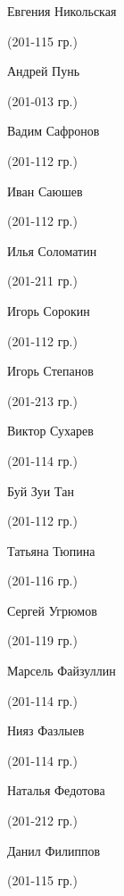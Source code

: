 \begin{multicols}{2}
\begin{small}
\begin{enumerate*}
	\item Евгения Никольская\begin{tiny} (201-115 гр.)\end{tiny}
	\item Андрей Пунь\begin{tiny} (201-013 гр.)\end{tiny}
	\item Вадим Сафронов\begin{tiny} (201-112 гр.)\end{tiny}
	\item Иван Саюшев\begin{tiny} (201-112 гр.)\end{tiny}
	\item Илья Соломатин\begin{tiny} (201-211 гр.)\end{tiny}
	\item Игорь Сорокин\begin{tiny} (201-112 гр.)\end{tiny}
	\item Игорь Степанов\begin{tiny} (201-213 гр.)\end{tiny}
	\item Виктор Сухарев\begin{tiny} (201-114 гр.)\end{tiny}
	\item Буй Зуи Тан\begin{tiny} (201-112 гр.)\end{tiny}
	\item Татьяна Тюпина\begin{tiny} (201-116 гр.)\end{tiny}
	\item Сергей Угрюмов\begin{tiny} (201-119 гр.)\end{tiny}
	\item Марсель Файзуллин\begin{tiny} (201-114 гр.)\end{tiny}
	\item Нияз Фазлыев\begin{tiny} (201-114 гр.)\end{tiny}
	\item Наталья Федотова\begin{tiny} (201-212 гр.)\end{tiny}
	\item Данил Филиппов\begin{tiny} (201-115 гр.)\end{tiny}

\end{enumerate*}
\end{small}
\end{multicols}
